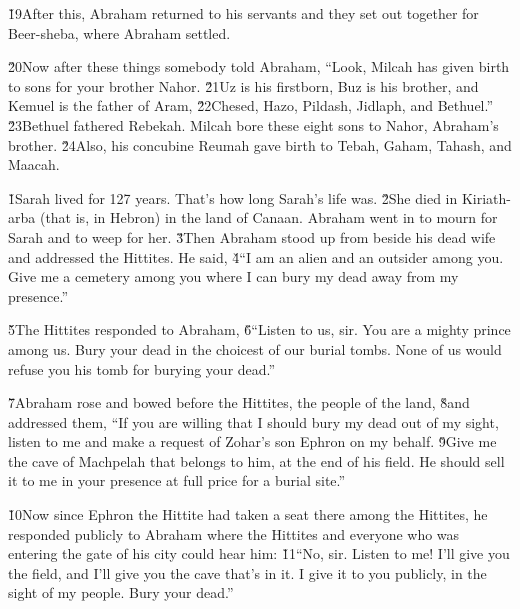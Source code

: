 \v{19}After this, Abraham returned to his servants and they set out together for Beer-sheba, where Abraham settled.

\v{20}Now after these things somebody told Abraham, ``Look, Milcah has given birth to sons for your brother Nahor. \v{21}Uz is his firstborn, Buz is his brother, and Kemuel is the father of Aram, \v{22}Chesed, Hazo, Pildash, Jidlaph, and Bethuel.'' \v{23}Bethuel fathered Rebekah. Milcah bore these eight sons to Nahor, Abraham's brother. \v{24}Also, his concubine Reumah gave birth to Tebah, Gaham, Tahash, and Maacah.

\v{1}Sarah lived for 127 years. That's how long Sarah's life was. \v{2}She died in Kiriath-arba (that is, in Hebron) in the land of Canaan. Abraham went in to mourn for Sarah and to weep for her. \v{3}Then Abraham stood up from beside his dead wife and addressed the Hittites. He said, \v{4}``I am an alien and an outsider among you. Give me a cemetery among you where I can bury my dead away from my presence.''

\v{5}The Hittites responded to Abraham, \v{6}``Listen to us, sir. You are a mighty prince among us. Bury your dead in the choicest of our burial tombs. None of us would refuse you his tomb for burying your dead.''

\v{7}Abraham rose and bowed before the Hittites, the people of the land, \v{8}and addressed them, ``If you are willing that I should bury my dead out of my sight, listen to me and make a request of Zohar's son Ephron on my behalf. \v{9}Give me the cave of Machpelah that belongs to him, at the end of his field. He should sell it to me in your presence at full price for a burial site.''

\v{10}Now since Ephron the Hittite had taken a seat there among the Hittites, he responded publicly to Abraham where the Hittites and everyone who was entering the gate of his city could hear him: \v{11}``No, sir. Listen to me! I'll give you the field, and I'll give you the cave that's in it. I give it to you publicly, in the sight of my people. Bury your dead.''

